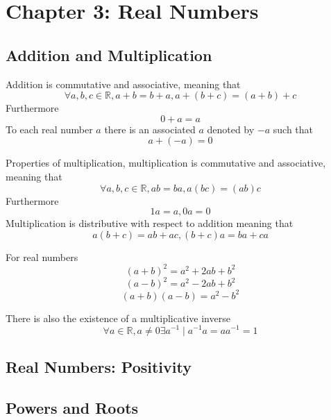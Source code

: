 \section{Chapter 3: Real Numbers}
\subsection{Addition and Multiplication}
\begin{addition}
Addition is commutative and associative, meaning that
\[
\forall a, b, c \in \mathbb{R}, a + b = b + a, a + (b + c) = (a + b) + c
\]
Furthermore
\[
0 + a = a
\]
To each real number $a$ there is an associated $a$ denoted by $-a$ such that
\[
a + (-a) = 0
\]
\end{addition}
\begin{multiplication}
Properties of multiplication, multiplication is commutative and associative, meaning that
\[
\forall a, b, c \in \mathbb{R}, ab = ba, a(bc) = (ab)c
\]
Furthermore
\[
1a = a, 0a = 0
\]
Multiplication is distributive with respect to addition meaning that
\[
a(b + c) = ab + ac, (b + c)a = ba + ca
\]
\end{multiplication}
\begin{corollary}
For real numbers
\[
(a + b)^2 = a^2 + 2ab + b^2
\]
\[
(a - b)^2 = a^2 - 2ab + b^2
\]
\[
(a + b)(a - b) = a^2 - b^2
\]
\end{corollary}
\begin{corollary}
There is also the existence of a multiplicative inverse
\[
\forall a \in \mathbb{R}, a \neq 0 \exists a^{-1} \mid a^{-1}a = aa^{-1} = 1
\]
\end{corollary}
\subsection{Real Numbers: Positivity}
\theoremstyle{plain}
\newtheorem{positivity}{Positivity}[section]
\subsection{Powers and Roots}
\theoremstyle{plain}
\newtheorem{powers}{Powers}[section]
